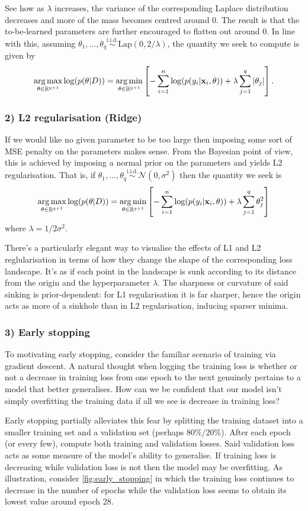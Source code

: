 \documentclass[11pt]{article}
\begin{document}
See how as $\lambda$ increases, the variance of the corresponding Laplace distribution decreases and more of the mass becomes centred around 0. The result is that the to-be-learned parameters are further encouraged to flatten out around 0. In line with this, assuming $\theta_1,\dots,\theta_q\overset{\text{i.i.d.}}{\sim}\text{Lap}(0, 2/\lambda)$, the quantity we seek to compute is given by
$$
\operatorname*{arg\,max}_{\theta\in\mathbb{R}^{q+1}}\log(p(\theta|D))
=
\operatorname*{arg\,min}_{\theta\in\mathbb{R}^{q+1}}\left[-\sum_{i=1}^n\log(p(y_i|\mathbf{x}_i,\theta))+\lambda\sum_{j=1}^q|\theta_j|\right].
$$

\subsubsection*{2) L2 regularisation (Ridge)}
If we would like no given parameter to be too large then imposing some sort of MSE penalty on the parameters makes sense. From the Bayesian point of view, this is achieved by imposing a normal prior on the parameters and yields L2 regularisation. That is, if $\theta_1,\dots,\theta_q\overset{\text{i.i.d.}}{\sim}\mathcal{N}(0,\sigma^2)$ then the quantity we seek is
$$
\operatorname*{arg\,max}_{\theta\in\mathbb{R}^{q+1}}\log(p(\theta|D))
=
\operatorname*{arg\,min}_{\theta\in\mathbb{R}^{q+1}}\left[-\sum_{i=1}^n\log(p(y_i|\mathbf{x}_i,\theta))+\lambda\sum_{j=1}^q \theta_j^2\right]
$$
where $\lambda=1/2\sigma^2$.

There's a particularly elegant way to visualise the effects of L1 and L2 reglularisation in terms of how they change the shape of the corresponding loss landscape. It's as if each point in the landscape is sunk according to its distance from the origin and the hyperparameter $\lambda$. The sharpness or curvature of said sinking is prior-dependent: for L1 regularisation it is far sharper, hence the origin acts as more of a sinkhole than in L2 regularisation, inducing sparser minima.

\subsubsection*{3) Early stopping} To motivating early stopping, consider the familiar scenario of training via gradient descent. A natural thought when logging the training loss is whether or not a decrease in training loss from one epoch to the next genuinely pertains to a model that better generalises. How can we be confident that our model isn't simply overfitting the training data if all we see is decrease in training loss?

Early stopping partially alleviates this fear by splitting the training dataset into a smaller training set and a validation set (perhaps 80\%/20\%). After each epoch (or every few), compute both training and validation losses. Said validation loss acts as some measure of the model's ability to generalise. If training loss is decreasing while validation loss is not then the model may be overfitting. As illustration, consider \autoref{fig:early_stopping} in which the training loss continues to decrease in the number of epochs while the validation loss seems to obtain its lowest value around epoch 28.
\end{document}
